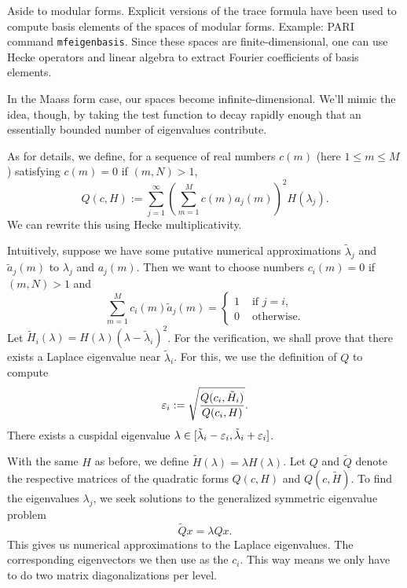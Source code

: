 \documentclass[reqno]{amsart} 
\begin{document}
Aside to modular forms.  Explicit versions of the trace formula have been used to compute basis elements of the spaces of modular forms.  Example: PARI command \texttt{mfeigenbasis}.  Since these spaces are finite-dimensional, one can use Hecke operators and linear algebra to extract Fourier coefficients of basis elements.

In the Maass form case, our spaces become infinite-dimensional. We'll mimic the idea, though, by taking the test function to decay rapidly enough that an essentially bounded number of eigenvalues contribute.


As for details, we define, for a sequence of real numbers $c(m)$ (here $1 \leq m \leq M$) satisfying $c(m) = 0$ if $(m,N) > 1$,
\begin{equation*}
  Q (c, H) :=
  \sum_{j = 1 }^\infty \left( \sum_{m = 1 }^M c (m ) a_j (m ) \right)^2 H (\lambda_j).
\end{equation*}
We can rewrite this using Hecke multiplicativity.

Intuitively, suppose we have some putative numerical approximations $\tilde{\lambda}_j$ and $\tilde{a}_j(m)$ to $\lambda_j$ and $a_j(m)$.  Then we want to choose numbers $c_i(m) = 0$ if $(m, N ) > 1$ and
\begin{equation*}
  \sum_{m = 1}^M c_i (m ) \tilde{a}_j(m)
  =
  \begin{cases}
1 & \text{ if } j = i, \\
0 & \text{ otherwise.}
\end{cases}
\end{equation*}
Let $\tilde{H}_i(\lambda) = H(\lambda) (\lambda - \tilde{\lambda}_i)^2$.  For the verification, we shall prove that there exists a Laplace eigenvalue near $\tilde{\lambda}_i$.  For this, we use the definition of $Q$ to compute
\begin{equation*}
\varepsilon_i := \sqrt{\frac{Q (c_i , \tilde{H}_i)}{Q (c_i, H)}}.
\end{equation*}
There exists a cuspidal eigenvalue $\lambda \in [\tilde{\lambda}_i - \varepsilon_i, \tilde{\lambda}_i + \varepsilon_i]$.

With the same $H$ as before, we define $\tilde{H}(\lambda) = \lambda H(\lambda)$.  Let $Q$ and $\tilde{Q}$ denote the respective matrices of the quadratic forms $Q (c, H)$ and $Q (c, \tilde{H})$.  To find the eigenvalues $\lambda_j $, we seek solutions to the generalized symmetric eigenvalue problem
\begin{equation*}
\tilde{Q} x = \lambda Q x.
\end{equation*}
This gives us numerical approximations to the Laplace eigenvalues.  The corresponding eigenvectors we then use as the $c_i$.  This way means we only have to do two matrix diagonalizations per level.
\end{document}
